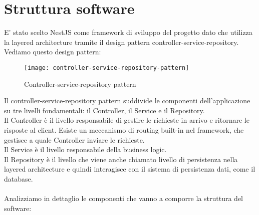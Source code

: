 \section{Struttura software}
E' stato scelto NestJS come framework di sviluppo del progetto dato che utilizza la layered architecture
tramite il design pattern controller-service-repository. Vediamo questo design pattern:
\begin{figure}[H]
    \centering
    \texttt{[image: controller-service-repository-pattern]}
    \caption{Controller-service-repository pattern}
\end{figure}
\leavevmode\newline
Il controller-service-repository pattern suddivide le componenti dell'applicazione su tre livelli fondamentali:
il Controller, il Service e il Repository.
\\
Il Controller è il livello responsabile di gestire le richieste in arrivo e ritornare le risposte al client.
Esiste un meccanismo di routing built-in nel framework, che gestisce a quale Controller inviare le richieste.
\\
Il Service è il livello responsabile della business logic.
\\
Il Repository è il livello che viene anche chiamato livello di persistenza nella layered architecture e quindi interagisce
con il sistema di persistenza dati, come il database.
\\\\
Analizziamo in dettaglio le componenti che vanno a comporre la struttura del software:

